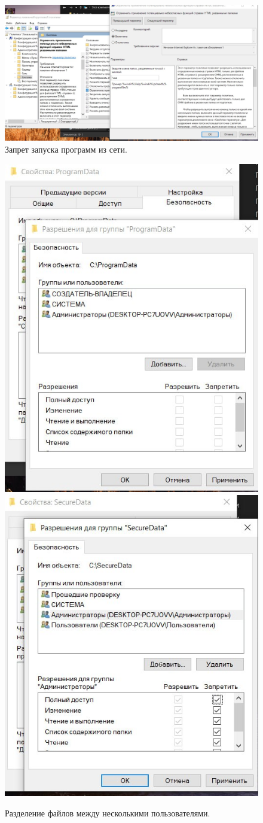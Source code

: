 \begin{figure}[h!]
    \centering
    \includegraphics[width=0.5\linewidth]{Pic/lab3/photo_2025-05-23_21-54-05.jpg}
    \caption{Запрет запуска программ из сети.}
    \label{disablexef}
\end{figure}

\begin{figure}[h!]
    \centering
    \includegraphics[width=0.4\linewidth]{Pic/lab3/photo_2025-05-23_21-54-07.jpg}
    \includegraphics[width=0.4\linewidth]{Pic/lab3/photo_2025-05-23_21-54-09.jpg}
    \caption{Разделение файлов между несколькими пользователями.}
    \label{fig:enter-label}
\end{figure}

